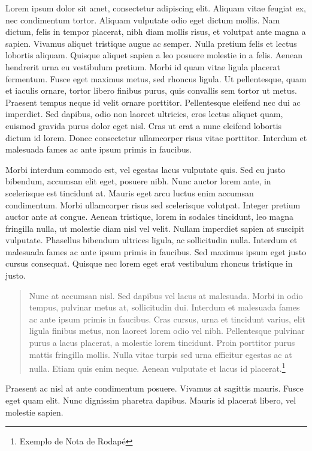 Lorem ipsum dolor sit amet, consectetur adipiscing elit. Aliquam vitae feugiat ex, nec condimentum tortor. Aliquam vulputate odio eget dictum mollis. Nam dictum, felis in tempor placerat, nibh diam mollis risus, et volutpat ante magna a sapien. Vivamus aliquet tristique augue ac semper. Nulla pretium felis et lectus lobortis aliquam. Quisque aliquet sapien a leo posuere molestie in a felis. Aenean hendrerit urna eu vestibulum pretium. Morbi id quam vitae ligula placerat fermentum. Fusce eget maximus metus, sed rhoncus ligula. Ut pellentesque, quam et iaculis ornare, tortor libero finibus purus, quis convallis sem tortor ut metus. Praesent tempus neque id velit ornare porttitor. Pellentesque eleifend nec dui ac imperdiet. Sed dapibus, odio non laoreet ultricies, eros lectus aliquet quam, euismod gravida purus dolor eget nisl. Cras ut erat a nunc eleifend lobortis dictum id lorem. Donec consectetur ullamcorper risus vitae porttitor. Interdum et malesuada fames ac ante ipsum primis in faucibus.

Morbi interdum commodo est, vel egestas lacus vulputate quis. Sed eu justo bibendum, accumsan elit eget, posuere nibh. Nunc auctor lorem ante, in scelerisque est tincidunt at. Mauris eget arcu luctus enim accumsan condimentum. Morbi ullamcorper risus sed scelerisque volutpat. Integer pretium auctor ante at congue. Aenean tristique, lorem in sodales tincidunt, leo magna fringilla nulla, ut molestie diam nisl vel velit. Nullam imperdiet sapien at suscipit vulputate. Phasellus bibendum ultrices ligula, ac sollicitudin nulla. Interdum et malesuada fames ac ante ipsum primis in faucibus. Sed maximus ipsum eget justo cursus consequat. Quisque nec lorem eget erat vestibulum rhoncus tristique in justo.

\begin{quote}
    Nunc at accumsan nisl. Sed dapibus vel lacus at malesuada. Morbi in odio tempus, pulvinar metus at, sollicitudin dui. Interdum et malesuada fames ac ante ipsum primis in faucibus. Cras cursus, urna et tincidunt varius, elit ligula finibus metus, non laoreet lorem odio vel nibh. Pellentesque pulvinar purus a lacus placerat, a molestie lorem tincidunt. Proin porttitor purus mattis fringilla mollis. Nulla vitae turpis sed urna efficitur egestas ac at nulla. Etiam quis enim neque. Aenean vulputate et lacus id placerat.\footnote{Exemplo de Nota de Rodapé}
\end{quote} Praesent ac nisl at ante condimentum posuere. Vivamus at sagittis mauris. Fusce eget quam elit. Nunc dignissim pharetra dapibus. Mauris id placerat libero, vel molestie sapien.


